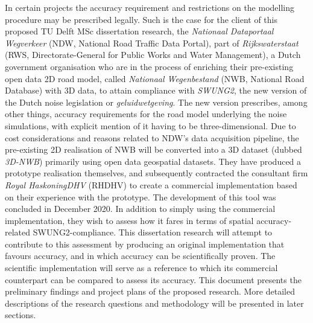 In certain projects the accuracy requirement and restrictions on the modelling procedure may be prescribed legally. Such is the case for the client of this proposed TU Delft MSc dissertation research, the \textit{Nationaal Dataportaal Wegverkeer} (NDW, National Road Traffic Data Portal), part of \textit{Rijkswaterstaat} (RWS, Directorate-General for Public Works and Water Management), a Dutch government organisation who are in the process of enriching their pre-existing open data 2D road model, called \textit{Nationaal Wegenbestand} (NWB, National Road Database) with 3D data, to attain compliance with \textit{SWUNG2}, the new version of the Dutch noise legislation or \textit{geluidwetgeving}. The new version prescribes, among other things, accuracy requirements for the road model underlying the noise simulations, with explicit mention of it having to be three-dimensional. Due to cost considerations and reasons related to NDW’s data acquisition pipeline, the pre-existing 2D realisation of NWB will be converted into a 3D dataset (dubbed \textit{3D-NWB}) primarily using open data geospatial datasets. They have produced a prototype realisation themselves, and subsequently contracted the consultant firm \textit{Royal HaskoningDHV} (RHDHV) to create a commercial implementation based on their experience with the prototype. The development of this tool was concluded in December 2020. In addition to simply using the commercial implementation, they wish to assess how it fares in terms of spatial accuracy-related SWUNG2-compliance. This dissertation research will attempt to contribute to this assessment by producing an original implementation that favours accuracy, and in which accuracy can be scientifically proven. The scientific implementation will serve as a reference to which its commercial counterpart can be compared to assess its accuracy. This document presents the preliminary findings and project plans of the proposed research. More detailed descriptions of the research questions and methodology will be presented in later sections.

